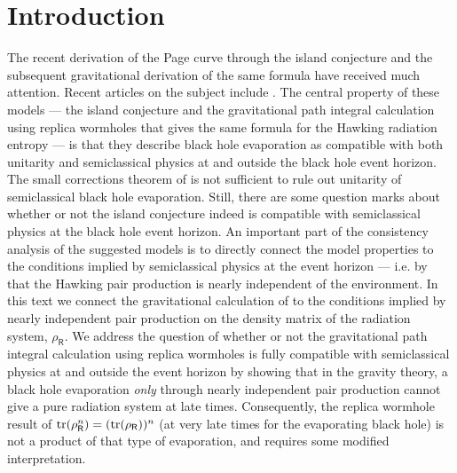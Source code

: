 \documentclass[11pt]{article}
\numberwithin{equation}{section}
\begin{document}
\section{Introduction}
The recent derivation of the Page curve \cite{Page:1993wv,Page:2013dx} through the island conjecture \cite{Penington:2019npb,Almheiri:2019psf,Almheiri:2019hni} and the subsequent gravitational derivation of the same formula \cite{Penington:2019kki,Almheiri:2019qdq} have received much attention. Recent articles on the subject include \cite{Akers:2019nfi,Almheiri:2019yqk,Bousso:2019ykv,Almheiri:2019psy,Liu:2020gnp,Marolf:2020xie,Gautason:2020tmk,Anegawa:2020ezn,Sully:2020pza,Hartman:2020swn,Chen:2020uac,Bousso:2020kmy,Anous:2020lka,Engelhardt:2020qpv,Chen:2020tes,Hartman:2020khs,Liu:2020jsv,VanRaamsdonk:2020tlr,Akers:2020pmf,Stanford:2020wkf,Chen:2020hmv,Marolf:2020rpm,Goto:2020wnk,Colin-Ellerin:2020mva,Geng:2020fxl,Raju:2020smc}. The central property of these models --- the island conjecture and the gravitational path integral calculation using replica wormholes that gives the same formula for the Hawking radiation entropy --- is that they describe black hole evaporation as compatible with both unitarity and semiclassical physics at and outside the black hole event horizon. The small corrections theorem of \cite{Mathur:2009hf} is not sufficient to rule out unitarity of semiclassical black hole evaporation. Still, there are some question marks about whether or not the island conjecture indeed is compatible with semiclassical physics at the black hole event horizon. An important part of the consistency analysis of the suggested models is to directly connect the model properties to the conditions implied by semiclassical physics at the event horizon --- i.e. by that the Hawking pair production is nearly independent of the environment. In this text we connect the gravitational calculation of \cite{Penington:2019kki,Almheiri:2019qdq} to the conditions implied by nearly independent pair production on the density matrix of the radiation system, $\rho_\textsf{R}$. We address the question of whether or not the gravitational path integral calculation using replica wormholes is fully compatible with semiclassical physics at and outside the event horizon by showing that in the gravity theory, a black hole evaporation \emph{only} through nearly independent pair production cannot give a pure radiation system at late times. Consequently, the replica wormhole result of ${\rm tr}(\rho_\textsf{R}^n)=({\rm tr}(\rho_\textsf{R}))^n$ (at very late times for the evaporating black hole) is not a product of that type of evaporation, and requires some modified interpretation.
\end{document}

